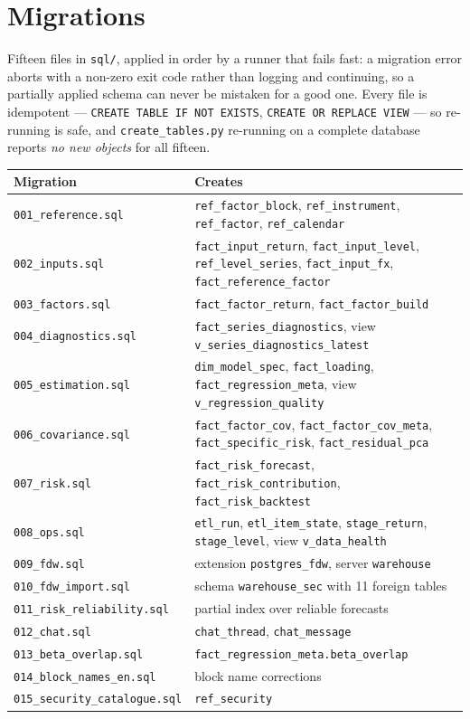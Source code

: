 \documentclass[11pt,a4paper]{article}
\newcommand{\code}[1]{\texttt{\small #1}}
\begin{document}
\section{Migrations}

Fifteen files in \code{sql/}, applied in order by a runner that fails fast: a
migration error aborts with a non-zero exit code rather than logging and
continuing, so a partially applied schema can never be mistaken for a good one.
Every file is idempotent --- \code{CREATE TABLE IF NOT EXISTS},
\code{CREATE OR REPLACE VIEW} --- so re-running is safe, and
\code{create\_tables.py} re-running on a complete database reports
\emph{no new objects} for all fifteen.

\begin{table}[htbp]
\centering\small
\begin{tabularx}{\textwidth}{@{}lX@{}}
\toprule
\textbf{Migration} & \textbf{Creates} \\
\midrule
\code{001\_reference.sql} & \code{ref\_factor\_block}, \code{ref\_instrument}, \code{ref\_factor}, \code{ref\_calendar} \\
\code{002\_inputs.sql} & \code{fact\_input\_return}, \code{fact\_input\_level}, \code{ref\_level\_series}, \code{fact\_input\_fx}, \code{fact\_reference\_factor} \\
\code{003\_factors.sql} & \code{fact\_factor\_return}, \code{fact\_factor\_build} \\
\code{004\_diagnostics.sql} & \code{fact\_series\_diagnostics}, view \code{v\_series\_diagnostics\_latest} \\
\code{005\_estimation.sql} & \code{dim\_model\_spec}, \code{fact\_loading}, \code{fact\_regression\_meta}, view \code{v\_regression\_quality} \\
\code{006\_covariance.sql} & \code{fact\_factor\_cov}, \code{fact\_factor\_cov\_meta}, \code{fact\_specific\_risk}, \code{fact\_residual\_pca} \\
\code{007\_risk.sql} & \code{fact\_risk\_forecast}, \code{fact\_risk\_contribution}, \code{fact\_risk\_backtest} \\
\code{008\_ops.sql} & \code{etl\_run}, \code{etl\_item\_state}, \code{stage\_return}, \code{stage\_level}, view \code{v\_data\_health} \\
\code{009\_fdw.sql} & extension \code{postgres\_fdw}, server \code{warehouse} \\
\code{010\_fdw\_import.sql} & schema \code{warehouse\_sec} with 11 foreign tables \\
\code{011\_risk\_reliability.sql} & partial index over reliable forecasts \\
\code{012\_chat.sql} & \code{chat\_thread}, \code{chat\_message} \\
\code{013\_beta\_overlap.sql} & \code{fact\_regression\_meta.beta\_overlap} \\
\code{014\_block\_names\_en.sql} & block name corrections \\
\code{015\_security\_catalogue.sql} & \code{ref\_security} \\
\bottomrule
\end{tabularx}
\end{table}
\end{document}
